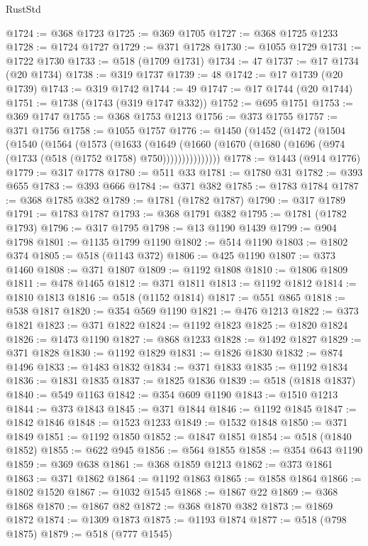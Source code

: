 \begin{lexlean}{RustStd}
\begin{coremodule}
@1724 := @368 @1723
@1725 := @369 @1705
@1727 := @368 @1725 @1233
@1728 := @1724 @1727
@1729 := @371 @1728
@1730 := @1055 @1729
@1731 := @1722 @1730
@1733 := @518 (@1709 @1731)
@1734 := 47
@1737 := @17 @1734 (@20 @1734)
@1738 := @319 @1737
@1739 := 48
@1742 := @17 @1739 (@20 @1739)
@1743 := @319 @1742
@1744 := 49
@1747 := @17 @1744 (@20 @1744)
@1751 := @1738 (@1743 (@319 @1747 @332))
@1752 := @695 @1751
@1753 := @369 @1747
@1755 := @368 @1753 @1213
@1756 := @373 @1755
@1757 := @371 @1756
@1758 := @1055 @1757
@1776 := @1450
    (@1452
      (@1472
        (@1504
          (@1540
            (@1564
              (@1573
                (@1633
                  (@1649
                    (@1660 (@1670 (@1680 (@1696 (@974 (@1733 (@518 (@1752 @1758) @750)))))))))))))))
@1778 := @1443 (@914 @1776)
@1779 := @317 @1778
@1780 := @511 @33
@1781 := @1780 @31
@1782 := @393 @655
@1783 := @393 @666
@1784 := @371 @382
@1785 := @1783 @1784
@1787 := @368 @1785 @382
@1789 := @1781 (@1782 @1787)
@1790 := @317 @1789
@1791 := @1783 @1787
@1793 := @368 @1791 @382
@1795 := @1781 (@1782 @1793)
@1796 := @317 @1795
@1798 := @13 @1190 @1439
@1799 := @904 @1798
@1801 := @1135 @1799 @1190
@1802 := @514 @1190
@1803 := @1802 @374
@1805 := @518 (@1143 @372)
@1806 := @425 @1190
@1807 := @373 @1460
@1808 := @371 @1807
@1809 := @1192 @1808
@1810 := @1806 @1809
@1811 := @478 @1465
@1812 := @371 @1811
@1813 := @1192 @1812
@1814 := @1810 @1813
@1816 := @518 (@1152 @1814)
@1817 := @551 @865
@1818 := @538 @1817
@1820 := @354 @569 @1190
@1821 := @476 @1213
@1822 := @373 @1821
@1823 := @371 @1822
@1824 := @1192 @1823
@1825 := @1820 @1824
@1826 := @1473 @1190
@1827 := @868 @1233
@1828 := @1492 @1827
@1829 := @371 @1828
@1830 := @1192 @1829
@1831 := @1826 @1830
@1832 := @874 @1496
@1833 := @1483 @1832
@1834 := @371 @1833
@1835 := @1192 @1834
@1836 := @1831 @1835
@1837 := @1825 @1836
@1839 := @518 (@1818 @1837)
@1840 := @549 @1163
@1842 := @354 @609 @1190
@1843 := @1510 @1213
@1844 := @373 @1843
@1845 := @371 @1844
@1846 := @1192 @1845
@1847 := @1842 @1846
@1848 := @1523 @1233
@1849 := @1532 @1848
@1850 := @371 @1849
@1851 := @1192 @1850
@1852 := @1847 @1851
@1854 := @518 (@1840 @1852)
@1855 := @622 @945
@1856 := @564 @1855
@1858 := @354 @643 @1190
@1859 := @369 @638
@1861 := @368 @1859 @1213
@1862 := @373 @1861
@1863 := @371 @1862
@1864 := @1192 @1863
@1865 := @1858 @1864
@1866 := @1802 @1520
@1867 := @1032 @1545
@1868 := @1867 @22
@1869 := @368 @1868
@1870 := @1867 @82
@1872 := @368 @1870 @382
@1873 := @1869 @1872
@1874 := @1309 @1873
@1875 := @1193 @1874
@1877 := @518 (@798 @1875)
@1879 := @518 (@777 @1545)

\end{coremodule}
\end{lexlean}
